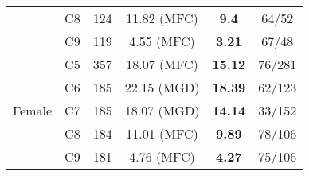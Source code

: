 \documentclass{article}
\begin{document}
\begin{table}[h!tb]
\begin{tabular}{cc|c|c|c|c|}
\multicolumn{1}{|c|}{} & C8 & 124 & 11.82 (MFC) & {\bf 9.4} & 64/52 \\ \cline{2-6} 
\multicolumn{1}{|c|}{} & C9 & 119 & 4.55 (MFC) & {\bf 3.21} & 67/48 \\ \hline
\multicolumn{1}{|c|}{\multirow{5}{*}{Female}} & C5 & 357 & 18.07 (MFC) & {\bf 15.12} & 76/281 \\ \cline{2-6} 
\multicolumn{1}{|c|}{} & C6 & 185 & 22.15 (MGD) & {\bf 18.39} & 62/123 \\ \cline{2-6} 
\multicolumn{1}{|c|}{} & C7 & 185 & 18.07 (MGD) & {\bf 14.14} & 33/152 \\ \cline{2-6} 
\multicolumn{1}{|c|}{} & C8 & 184 & 11.01 (MFC) & {\bf 9.89} & 78/106 \\ \cline{2-6} 
\multicolumn{1}{|c|}{} & C9 & 181 & 4.76 (MFC) & {\bf 4.27} & 75/106 \\ \hline
\end{tabular}
\label{tab:ubm-spkrCount}
\end{table}
\end{document}
